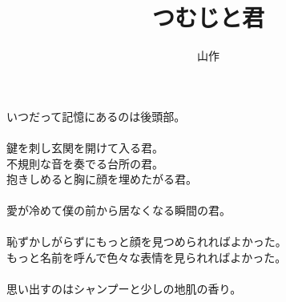 \documentclass[a5j,12pt]{tbook}
\title{つむじと君}
\author{\rensuji{J}山\rensuji{B}作}
\date{}
\begin{document}
\maketitle

いつだって記憶にあるのは後頭部。\\
\\
鍵を刺し玄関を開けて入る君。\\
不規則な音を奏でる台所の君。\\
抱きしめると胸に顔を埋めたがる君。\\
\\
愛が冷めて僕の前から居なくなる瞬間の君。\\
\\
恥ずかしがらずにもっと顔を見つめられればよかった。\\
もっと名前を呼んで色々な表情を見られればよかった。\\
\\
思い出すのはシャンプーと少しの地肌の香り。
\end{document}
